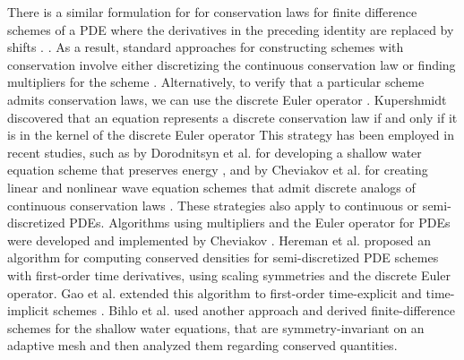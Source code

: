 \documentclass[runningheads]{llncs}
\newcommand{\1}{\chi}
\begin{document}
There is a similar formulation for
for conservation laws for finite difference schemes of a PDE  where the derivatives in the preceding identity are replaced by shifts \cite{hydon01}.  . As a result, standard approaches for constructing schemes with conservation involve either discretizing the continuous conservation law or finding multipliers for the scheme \cite{dorodnitsyn21}.
Alternatively, 
to verify that a particular scheme admits conservation laws, we can use the  discrete Euler operator \cite{cheviakov20}. Kupershmidt \cite[II. Theorem 31]{kupershmidt85} discovered that an equation represents a discrete conservation law if and only if it is in the kernel of the discrete Euler operator
This strategy has been employed in recent studies, such as by Dorodnitsyn et al. for developing a shallow water equation scheme that preserves energy \cite{dorodnitsyn21}, and by Cheviakov et al. for creating linear and nonlinear wave equation schemes that admit discrete analogs of continuous conservation laws \cite{cheviakov20}.
These strategies also apply to continuous or semi-discretized PDEs. Algorithms using multipliers and the Euler operator for PDEs were developed and implemented by Cheviakov \cite{cheviakov07,cheviakov10}. Hereman et al. \cite{hereman04,hereman08} proposed an algorithm for computing conserved densities for semi-discretized PDE schemes with first-order time derivatives, using scaling symmetries and the discrete Euler operator. Gao et al. extended this algorithm to first-order time-explicit \cite{gao02} and time-implicit schemes \cite{gao04}.
Bihlo et al. \cite{bihlo12} used another approach and derived finite-difference schemes for the shallow water equations, that are symmetry-invariant on an adaptive mesh and then analyzed them regarding conserved quantities.
\end{document}
